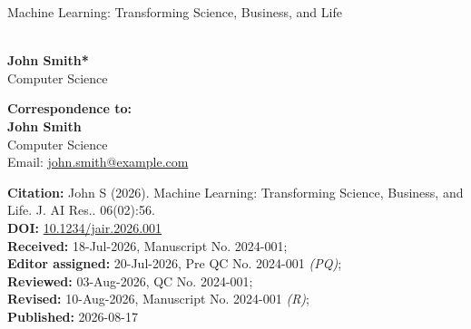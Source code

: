 \documentclass[twoside]{article}
\begin{document}
\setcounter{page}{56}
\thispagestyle{firstpage}

\begin{center}
    {\fontsize{18}{22}\sffamily\bfseries\color{color_102993}%
     \begin{otherlanguage}{english}%
     Machine Learning: Transforming Science, Business, and Life%
     \end{otherlanguage}}\\[18pt]

    {\fontsize{11}{14}\sffamily\bfseries\color{color_29791}%
     John Smith*}\\[6pt]

    {\fontsize{10}{12}\sffamily\color{color_29791}%
     Computer Science}
\end{center}


\begin{center}
\begin{tcolorbox}[colback=color_257187, colframe=color_257187, boxrule=0pt, arc=0pt,
                  left=10pt, right=10pt, top=3pt, bottom=3pt, width=490.12pt]

    \begin{minipage}[t]{185pt}
        \fontsize{8}{12}\sffamily\selectfont\color{color_29791}
        {\fontsize{8}{12}\sffamily\bfseries\color{color_102033} Correspondence to:}\\[6pt]
        \textbf{John Smith}\\
        Computer Science\\
        Email: \href{mailto:john.smith@example.com}{john.smith@example.com}
    \end{minipage}%
    \hfill
    \begin{minipage}[t]{205pt}
        \fontsize{8}{12.5}\sffamily\selectfont\color{color_29791}
        \textbf{Citation:} John S (2026). Machine Learning: Transforming Science, Business, and Life. J. AI Res.. 06(02):56.\\[3pt]
                \textbf{DOI:} \href{https://example.com/journal-ai}{10.1234/jair.2026.001}\\[3pt]
                \textbf{Received:} 18-Jul-2026, Manuscript No. 2024-001;\\
        \textbf{Editor assigned:} 20-Jul-2026, Pre QC No. 2024-001 \textit{(PQ)};\\
        \textbf{Reviewed:} 03-Aug-2026, QC No. 2024-001;\\
        \textbf{Revised:} 10-Aug-2026, Manuscript No. 2024-001 \textit{(R)};\\
        \textbf{Published:} 2026-08-17
    \end{minipage}
\end{tcolorbox}
\end{center}
\end{document}

